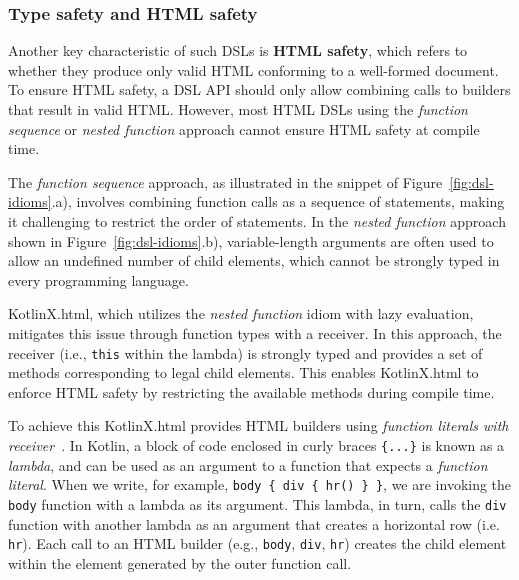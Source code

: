 
\subsubsection{Type safety and HTML safety}

Another key characteristic of such DSLs is \textbf{HTML safety}, which refers to
whether they produce only valid HTML conforming to a well-formed document.
To ensure HTML safety, a DSL API should only allow combining calls to builders
that result in valid HTML. 
However, most HTML DSLs using the \textit{function sequence} or \textit{nested
function} approach cannot ensure HTML safety at compile time. 

The \textit{function sequence} approach, as illustrated in the snippet of
Figure~\ref{fig:dsl-idioms}.a), involves combining function calls as a sequence of
statements, making it challenging to restrict the order of statements. 
In the \textit{nested function} approach shown in
Figure~\ref{fig:dsl-idioms}.b), variable-length arguments are often used to
allow an undefined number of child elements, which cannot be strongly typed in
every programming language.

KotlinX.html, which utilizes the \textit{nested function} idiom with lazy
evaluation, mitigates this issue through function types with a receiver. 
In this approach, the receiver (i.e., \texttt{this} within the lambda) is
strongly typed and provides a set of methods corresponding to legal child
elements.
This enables KotlinX.html to enforce HTML safety by restricting the available
methods during compile time.

To achieve this KotlinX.html provides HTML builders using \textit{function
literals with receiver}~\cite{kotlinlang}.
In Kotlin, a block of code enclosed in curly braces \texttt{\{...\}} is known as
a \emph{lambda}, and can be used as an argument to
a function that expects a \emph{function literal}.
When we write, for example, \texttt{body \{ div \{ hr() \} \}}, we are
invoking the \texttt{body} function with a lambda as its argument. This
lambda, in turn, calls the \texttt{div} function with another lambda as an
argument that creates a horizontal row (i.e. \texttt{hr}).
Each call to an HTML builder (e.g., \texttt{body}, \texttt{div}, \texttt{hr})
creates the child element within the element generated by the outer function
call.

